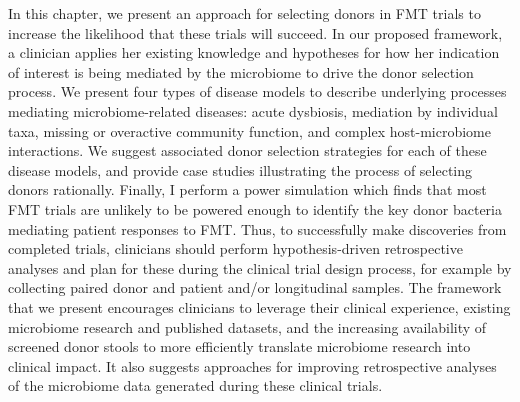 In this chapter, we present an approach for selecting donors in FMT trials to increase the likelihood that these trials will succeed.
In our proposed framework, a clinician applies her existing knowledge and hypotheses for how her indication of interest is being mediated by the microbiome to drive the donor selection process.
We present four types of disease models to describe underlying processes mediating microbiome-related diseases: acute dysbiosis, mediation by individual taxa, missing or overactive community function, and complex host-microbiome interactions.
We suggest associated donor selection strategies for each of these disease models, and provide case studies illustrating the process of selecting donors rationally.
Finally, I perform a power simulation which finds that most FMT trials are unlikely to be powered enough to identify the key donor bacteria mediating patient responses to FMT.
Thus, to successfully make discoveries from completed trials, clinicians should perform hypothesis-driven retrospective analyses and plan for these during the clinical trial design process, for example by collecting paired donor and patient and/or longitudinal samples.
The framework that we present encourages clinicians to leverage their clinical experience, existing microbiome research and published datasets, and the increasing availability of screened donor stools to more efficiently translate microbiome research into clinical impact.
It also suggests approaches for improving retrospective analyses of the microbiome data generated during these clinical trials.

\begin{singlespace}


\end{singlespace}
